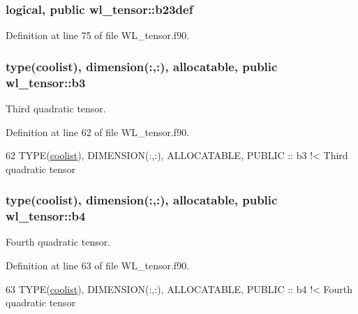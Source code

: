 \subsubsection[{\texorpdfstring{b23def}{b23def}}]{\setlength{\rightskip}{0pt plus 5cm}logical, public wl\+\_\+tensor\+::b23def}\hypertarget{namespacewl__tensor_acbe8020d8c3b634f2c677bff0937c593}{}\label{namespacewl__tensor_acbe8020d8c3b634f2c677bff0937c593}


Definition at line 75 of file W\+L\+\_\+tensor.\+f90.

\subsubsection[{\texorpdfstring{b3}{b3}}]{\setlength{\rightskip}{0pt plus 5cm}type({\bf coolist}), dimension(\+:,\+:), allocatable, public wl\+\_\+tensor\+::b3}\hypertarget{namespacewl__tensor_acb8c2d5390bd52d0639dc7ae48a0f7de}{}\label{namespacewl__tensor_acb8c2d5390bd52d0639dc7ae48a0f7de}


Third quadratic tensor. 



Definition at line 62 of file W\+L\+\_\+tensor.\+f90.


\begin{DoxyCode}
62   \textcolor{keywordtype}{TYPE}(\hyperlink{structtensor_1_1coolist}{coolist}), \textcolor{keywordtype}{DIMENSION(:,:)}, \textcolor{keywordtype}{ALLOCATABLE}, \textcolor{keywordtype}{PUBLIC} :: b3\textcolor{comment}{    !< Third quadratic tensor}
\end{DoxyCode}
\subsubsection[{\texorpdfstring{b4}{b4}}]{\setlength{\rightskip}{0pt plus 5cm}type({\bf coolist}), dimension(\+:,\+:), allocatable, public wl\+\_\+tensor\+::b4}\hypertarget{namespacewl__tensor_a38deaa44b73e766ce5cc8194e18a1540}{}\label{namespacewl__tensor_a38deaa44b73e766ce5cc8194e18a1540}


Fourth quadratic tensor. 



Definition at line 63 of file W\+L\+\_\+tensor.\+f90.


\begin{DoxyCode}
63   \textcolor{keywordtype}{TYPE}(\hyperlink{structtensor_1_1coolist}{coolist}), \textcolor{keywordtype}{DIMENSION(:,:)}, \textcolor{keywordtype}{ALLOCATABLE}, \textcolor{keywordtype}{PUBLIC} :: b4\textcolor{comment}{    !< Fourth quadratic tensor}
\end{DoxyCode}
